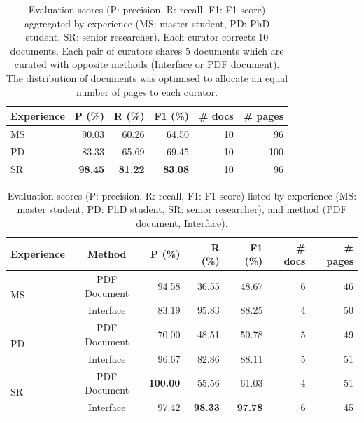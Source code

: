 \documentclass[]{interact}
\theoremstyle{plain} %
\theoremstyle{definition}
\theoremstyle{remark}
\begin{document}
\begin{table}[h]
\centering
\caption{Evaluation scores (P: precision, R: recall, F1: F1-score) aggregated by experience (MS: master student, PD: PhD student, SR: senior researcher). Each curator corrects 10 documents. Each pair of curators shares 5 documents which are curated with opposite methods (Interface or PDF document). The distribution of documents was optimised to allocate an equal number of pages to each curator.}
\begin{tabular}{lrrrrr}
\toprule
\textbf{Experience} & \textbf{P (\%)}   & \textbf{R (\%)}   & \textbf{F1 (\%)}  & \textbf{\#  docs} & \textbf{\# pages}\\
\midrule
MS      & 90.03             & 60.26             & 64.50           & 10  & 96    \\
PD      & 83.33             & 65.69             & 69.45           & 10  & 100   \\
SR      & \textbf{98.45}    & \textbf{81.22}    & \textbf{83.08}  & 10  & 96  \\
\bottomrule
\end{tabular}
\label{tab:accuracy-by-experience}
\end{table}


\begin{table}[h]
\centering\small
\caption{Evaluation scores (P: precision, R: recall, F1: F1-score) listed by experience (MS: master student, PD: PhD student, SR: senior researcher), and method (PDF document, Interface). }
\begin{tabular}{lcrrrrr}
\toprule
\textbf{Experience} & \textbf{Method} & \textbf{P (\%)} & \textbf{R (\%)} & 
\textbf{F1 (\%)}  & \textbf{\# docs} & \textbf{\# pages}\\
\midrule
\multirow{2}{*}{MS} & PDF Document & 94.58 & 36.55 & 48.67 & 6 & 46 \\
 & Interface & 83.19 & 95.83 & 88.25 & 4 & 50 \\
\midrule
\multirow{2}{*}{PD} & PDF Document & 70.00 & 48.51 & 50.78 & 5 & 49 \\
 & Interface & 96.67 & 82.86 & 88.11 & 5 & 51\\
\midrule
\multirow{2}{*}{SR} & PDF Document & \textbf{100.00} & 55.56 & 61.03 & 4 & 51\\
 & Interface & 97.42 & \textbf{98.33} & \textbf{97.78} & 6 & 45\\
\bottomrule
\end{tabular}
\label{tab:accuracy-by-experience-method}
\end{table}

\clearpage

\appendix

\end{document}

